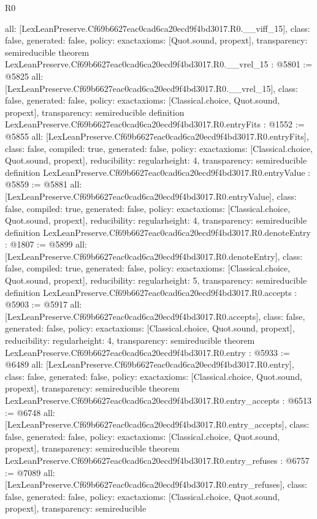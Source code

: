\begin{lexlean}{R0}
\begin{coremodule}
{  all: [LexLeanPreserve.Cf69b6627eac0cad6ca20ecd9f4bd3017.R0.__viff_15],
  class: false,
  generated: false,
  policy: exact{axioms: [Quot.sound, propext]},
  transparency: semireducible
}
theorem LexLeanPreserve.Cf69b6627eac0cad6ca20ecd9f4bd3017.R0.__vrel_15 : @5801 := @5825 {
  all: [LexLeanPreserve.Cf69b6627eac0cad6ca20ecd9f4bd3017.R0.__vrel_15],
  class: false,
  generated: false,
  policy: exact{axioms: [Classical.choice, Quot.sound, propext]},
  transparency: semireducible
}
definition LexLeanPreserve.Cf69b6627eac0cad6ca20ecd9f4bd3017.R0.entryFits : @1552 := @5855 {
  all: [LexLeanPreserve.Cf69b6627eac0cad6ca20ecd9f4bd3017.R0.entryFits],
  class: false,
  compiled: true,
  generated: false,
  policy: exact{axioms: [Classical.choice, Quot.sound, propext]},
  reducibility: regular{height: 4},
  transparency: semireducible
}
definition LexLeanPreserve.Cf69b6627eac0cad6ca20ecd9f4bd3017.R0.entryValue : @5859 := @5881 {
  all: [LexLeanPreserve.Cf69b6627eac0cad6ca20ecd9f4bd3017.R0.entryValue],
  class: false,
  compiled: true,
  generated: false,
  policy: exact{axioms: [Classical.choice, Quot.sound, propext]},
  reducibility: regular{height: 4},
  transparency: semireducible
}
definition LexLeanPreserve.Cf69b6627eac0cad6ca20ecd9f4bd3017.R0.denoteEntry : @1807 := @5899 {
  all: [LexLeanPreserve.Cf69b6627eac0cad6ca20ecd9f4bd3017.R0.denoteEntry],
  class: false,
  compiled: true,
  generated: false,
  policy: exact{axioms: [Classical.choice, Quot.sound, propext]},
  reducibility: regular{height: 5},
  transparency: semireducible
}
definition LexLeanPreserve.Cf69b6627eac0cad6ca20ecd9f4bd3017.R0.accepts : @5903 := @5917 {
  all: [LexLeanPreserve.Cf69b6627eac0cad6ca20ecd9f4bd3017.R0.accepts],
  class: false,
  generated: false,
  policy: exact{axioms: [Classical.choice, Quot.sound, propext]},
  reducibility: regular{height: 4},
  transparency: semireducible
}
theorem LexLeanPreserve.Cf69b6627eac0cad6ca20ecd9f4bd3017.R0.entry : @5933 := @6489 {
  all: [LexLeanPreserve.Cf69b6627eac0cad6ca20ecd9f4bd3017.R0.entry],
  class: false,
  generated: false,
  policy: exact{axioms: [Classical.choice, Quot.sound, propext]},
  transparency: semireducible
}
theorem LexLeanPreserve.Cf69b6627eac0cad6ca20ecd9f4bd3017.R0.entry_accepts : @6513 := @6748 {
  all: [LexLeanPreserve.Cf69b6627eac0cad6ca20ecd9f4bd3017.R0.entry_accepts],
  class: false,
  generated: false,
  policy: exact{axioms: [Classical.choice, Quot.sound, propext]},
  transparency: semireducible
}
theorem LexLeanPreserve.Cf69b6627eac0cad6ca20ecd9f4bd3017.R0.entry_refuses : @6757 := @7089 {
  all: [LexLeanPreserve.Cf69b6627eac0cad6ca20ecd9f4bd3017.R0.entry_refuses],
  class: false,
  generated: false,
  policy: exact{axioms: [Classical.choice, Quot.sound, propext]},
  transparency: semireducible
}


\end{coremodule}
\end{lexlean}
